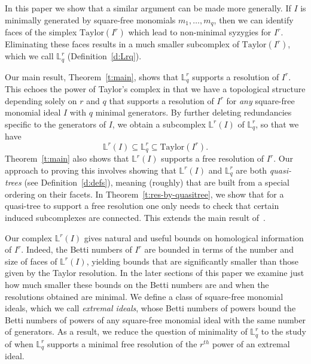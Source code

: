\documentclass[11pt]{article}
\theoremstyle{definition}
\numberwithin{equation}{section}
\newcommand{\Taylor}{\mathrm{Taylor}}
\newcommand{\Lrq}{\mathbb{L}^r_q}
\newcommand{\Lr}{\mathbb{L}^r}
\begin{document}
In this paper we show that a similar argument can be made more
generally.  If $I$ is minimally generated by square-free monomials
$m_1,\ldots,m_q$, then we can identify faces of the simplex
$\Taylor(I^r)$ which lead to non-minimal syzygies for $I^r$.
Eliminating these faces results in a much smaller subcomplex of
$\Taylor(I^r)$, which we call $\Lrq$ \textup{(}Definition~\ref{d:Lrq}\textup{)}.

Our main result, Theorem~\ref{t:main}, shows that $\Lrq$ supports a
resolution of $I^r$.  This echoes the power of Taylor's complex in
that we have a topological structure depending solely on $r$ and $q$
that supports a resolution of $I^r$ for \textit{any} square-free
monomial ideal $I$ with $q$ minimal generators.
By further deleting redundancies specific to the generators of $I$, we obtain a subcomplex $\Lr(I)$ of $\Lrq$, so that we have
$$\Lr(I) \subseteq \Lrq \subseteq \Taylor(I^r).$$ Theorem~\ref{t:main} also shows
that $\Lr(I)$ supports a free resolution of $I^r$.  Our approach
to proving this involves showing that $\Lr(I)$ and $\Lrq$ are both
\textit{quasi-trees} \textup{(}see Definition~\ref{d:defs}\textup{)}, meaning \textup{(}roughly\textup{)} that are
built from a special ordering on their facets. In
Theorem~\ref{t:res-by-quasitree}, we show that for a quasi-tree to support a
free resolution one only needs to check that certain induced subcomplexes are
connected. This extends the main result of~\cite{F14}.


Our complex $\Lr(I)$ gives natural and useful bounds on homological
information of $I^r$.  Indeed, the Betti numbers of $I^r$ are bounded
in terms of the number and size of faces of $\Lr(I)$, yielding bounds
that are significantly smaller than those given by the Taylor
resolution.  In the later sections of this paper we examine just how
much smaller these bounds on the Betti numbers are and when the
resolutions obtained are minimal.  We define a class of square-free
monomial ideals, which we call \textit{extremal ideals}, whose Betti
numbers of powers bound the Betti numbers of powers of any square-free
monomial ideal with the same number of generators. As a result, we
reduce the question of minimality of $\Lrq$ to the study of when
$\Lrq$ supports a minimal free resolution of the $r^{th}$ power of an
extremal ideal.
\end{document}

